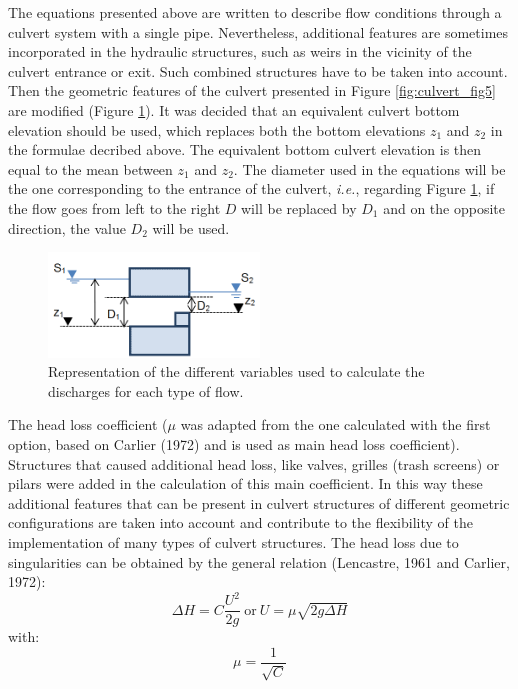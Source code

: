 The equations presented above are written to describe flow conditions through a
culvert system with a single pipe.
Nevertheless, additional features are sometimes incorporated in the hydraulic structures,
such as weirs in the vicinity of the culvert entrance or exit.
Such combined structures have to be taken into account.
Then the geometric features of the culvert presented in Figure \ref{fig:culvert_fig5}
are modified (Figure \ref{fig:culvert_fig6}).
It was decided that an equivalent culvert bottom elevation should be used,
which replaces both the bottom elevations $z_1$ and $z_2$ in the formulae decribed above.
The equivalent bottom culvert elevation is then equal to the mean between $z_1$ and $z_2$.
The diameter used in the equations will be the one corresponding to the entrance of the culvert,
\textit{i.e.}, regarding Figure \ref{fig:culvert_fig6}, if the flow goes from left
to the right $D$ will be replaced by $D_1$ and on the opposite direction,
the value $D_2$ will be used.

\begin{figure}[H]
\begin{center}
  \includegraphics[width=0.5\textwidth]{culvert_fig6.png}
\end{center}
\caption{Representation of the different variables used to
calculate the discharges for each type of flow.}
\label{fig:culvert_fig6}
\end{figure}

The head loss coefficient ($\mu$ was adapted from the one calculated with the first option,
based on Carlier (1972) and is used as main head loss coefficient).
Structures that caused additional head loss, like valves, grilles (trash screens) or pilars
were added in the calculation of this main coefficient.
In this way these additional features that can be present in culvert structures of
different geometric configurations are taken into account and contribute to
the flexibility of the implementation of many types of culvert structures.
The head loss due to singularities can be obtained by the general
relation (Lencastre, 1961 and Carlier, 1972):
\begin{equation}
\Delta H = C \dfrac{U^2}{2g} ~\text{or}~  U = \mu \sqrt{2g\Delta H}
\end{equation}
with:
\begin{equation}
\mu =\dfrac{1}{\sqrt{C}}
\end{equation}

